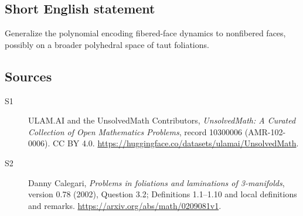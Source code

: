 \documentclass[11pt]{article}
\begin{document}
\subsection{Short English statement}
Generalize the polynomial encoding fibered-face dynamics to nonfibered faces, possibly on a broader polyhedral space of taut foliations.
\subsection{Sources}
\begin{description}
\item[\hypertarget{source:10300006:1}{S1}] ULAM.AI and the UnsolvedMath Contributors, \emph{UnsolvedMath: A Curated Collection of Open Mathematics Problems}, record 10300006 (AMR-102-0006). CC BY 4.0. \url{https://huggingface.co/datasets/ulamai/UnsolvedMath}.
\item[\hypertarget{source:10300006:2}{S2}] Danny Calegari, \emph{Problems in foliations and laminations of 3-manifolds}, version 0.78 (2002), Question 3.2; Definitions 1.1--1.10 and local definitions and remarks. \url{https://arxiv.org/abs/math/0209081v1}.
\end{description}
\label{end:10300006}
\end{document}
